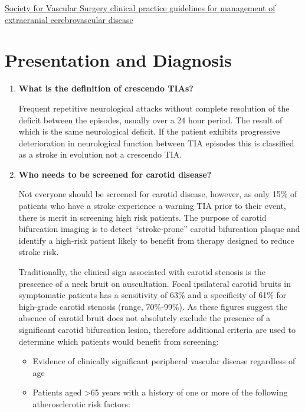 \documentclass[
]{book}
\begin{document}
\href{https://www.jvascsurg.org/article/S0741-5214(21)00893-4/fulltext}{Society for Vascular Surgery clinical practice guidelines for
management of extracranial cerebrovascular
disease}
\citep{aburahmaSocietyVascularSurgery2022}

\hypertarget{presentation-and-diagnosis}{%
\section{Presentation and Diagnosis}\label{presentation-and-diagnosis}}

\begin{enumerate}
\def\labelenumi{\arabic{enumi}.}
\item
  \textbf{What is the definition of crescendo TIAs?}

  Frequent repetitive neurological attacks without complete resolution
  of the deficit between the episodes, usually over a 24 hour period.
  The result of which is the same neurological deficit. If the patient
  exhibits progressive deterioration in neurological function between
  TIA episodes this is classified as a stroke in evolution not a
  crescendo TIA.
\item
  \textbf{Who needs to be screened for carotid disease?}

  Not everyone should be screened for carotid disease, however, as
  only 15\% of patients who have a stroke experience a warning TIA
  prior to their event, there is merit in screening high risk
  patients. The purpose of carotid bifurcation imaging is to detect
  ``stroke-prone'' carotid bifurcation plaque and identify a high-risk
  patient likely to benefit from therapy designed to reduce stroke
  risk.

  Traditionally, the clinical sign associated with carotid stenosis is
  the prescence of a neck bruit on auscultation. Focal ipsilateral
  carotid bruits in symptomatic patients has a sensitivity of 63\% and
  a specificity of 61\% for high-grade carotid stenosis (range,
  70\%-99\%). As these figures suggest the absence of carotid bruit does
  not absolutely exclude the presence of a significant carotid
  bifurcation lesion, therefore additional criteria are used to
  determine which patients would benefit from screening:

  \begin{itemize}
  \item
    Evidence of clinically significant peripheral vascular disease
    regardless of age
  \item
    Patients aged \textgreater65 years with a history of one or more of the
    following atherosclerotic risk factors:


\end{itemize}
\end{enumerate}
\end{document}
